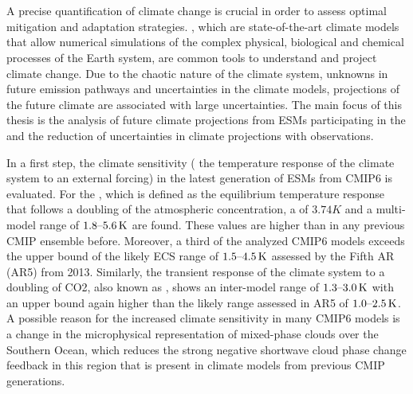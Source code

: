 


\chapter{\abstractname}

A precise quantification of climate change is crucial in order to assess
optimal mitigation and adaptation strategies. , which are
state-of-the-art climate models that allow numerical simulations of the complex
physical, biological and chemical processes of the Earth system, are common
tools to understand and project climate change. Due to the chaotic nature of
the climate system, unknowns in future emission pathways and uncertainties in
the climate models, projections of the future climate are associated with large
uncertainties. The main focus of this thesis is the analysis of future climate
projections from \acsp{ESM} participating in the  and the
reduction of uncertainties in climate projections with observations.

In a first step, the climate sensitivity (\ie{} the temperature response of the
climate system to an external forcing) in the latest generation of \acsp{ESM}
from \acs{CMIP}6 is evaluated. For the , which is defined as
the equilibrium temperature response that follows a doubling of the atmospheric
 concentration, a  of $3.74 \unit{K}$ and a
multi-model range of $\rangeunit{1.8}{5.6}{K}$ are found. These values are
higher than in any previous \acs{CMIP} ensemble before. Moreover, a third of
the analyzed \acs{CMIP}6 models exceeds the upper bound of the likely \acs{ECS}
range of $\rangeunit{1.5}{4.5}{K}$ assessed by the  Fifth
\acl{AR} (\acs{AR}5) from 2013. Similarly, the transient response of the
climate system to a doubling of \acs{CO2}, also known as ,
shows an inter-model range of $\rangeunit{1.3}{3.0}{K}$ with an upper bound
again higher than the likely range assessed in \acs{AR}5 of
$\rangeunit{1.0}{2.5}{K}$. A possible reason for the increased climate
sensitivity in many \acs{CMIP}6 models is a change in the microphysical
representation of mixed-phase clouds over the Southern Ocean, which reduces the
strong negative shortwave cloud phase change feedback in this region that is
present in climate models from previous \acs{CMIP} generations.

